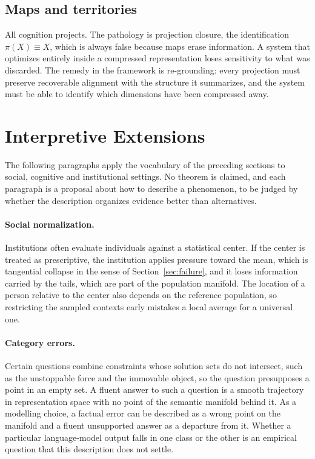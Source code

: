 \documentclass[11pt,a4paper]{article}
\theoremstyle{definition}
\theoremstyle{remark}
\begin{document}
\subsection{Maps and territories}

All cognition projects. The pathology is projection closure, the
identification $\pi(X)\equiv X$, which is always false because maps erase
information. A system that optimizes entirely inside a compressed
representation loses sensitivity to what was discarded. The remedy in the
framework is re-grounding: every projection must preserve recoverable
alignment with the structure it summarizes, and the system must be able to
identify which dimensions have been compressed away.

\section{Interpretive Extensions}\label{sec:applications}

The following paragraphs apply the vocabulary of the preceding sections to
social, cognitive and institutional settings. No theorem is claimed, and each
paragraph is a proposal about how to describe a phenomenon, to be judged by
whether the description organizes evidence better than alternatives.

\paragraph{Social normalization.}
Institutions often evaluate individuals against a statistical center. If the
center is treated as prescriptive, the institution applies pressure toward
the mean, which is tangential collapse in the sense of
Section~\ref{sec:failure}, and it loses information carried by the tails,
which are part of the population manifold. The location of a person relative
to the center also depends on the reference population, so restricting the
sampled contexts early mistakes a local average for a universal one.

\paragraph{Category errors.}
Certain questions combine constraints whose solution sets do not intersect,
such as the unstoppable force and the immovable object, so the question
presupposes a point in an empty set. A fluent answer to such a question is a
smooth trajectory in representation space with no point of the semantic
manifold behind it. As a modelling choice, a factual error can be described
as a wrong point on the manifold and a fluent unsupported answer as a
departure from it. Whether a particular language-model output falls in one
class or the other is an empirical question that this description does not
settle.
\end{document}
